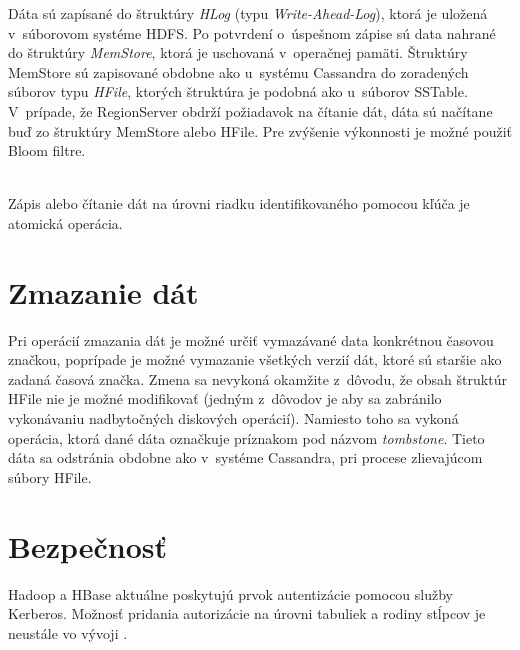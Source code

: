 \documentclass[11pt,twoside,a4paper]{book}
\begin{document}
Dáta sú zapísané do štruktúry \emph{HLog} (typu \emph{Write-Ahead-Log}), ktorá je uložená v~súborovom systéme HDFS. Po potvrdení o~úspešnom zápise sú data nahrané do štruktúry \emph{MemStore}, ktorá je uschovaná v~operačnej pamäti. Štruktúry MemStore sú zapisované obdobne ako u~systému Cassandra do zoradených súborov typu \emph{HFile}, ktorých štruktúra je podobná ako u~súborov SSTable. 
\noindent
V~prípade, že RegionServer obdrží požiadavok na čítanie dát, dáta sú načítane buď zo štruktúry MemStore alebo HFile. Pre zvýšenie výkonnosti je možné použiť Bloom filtre.

% 
% 
\noindent
\\
Zápis alebo čítanie dát na úrovni riadku identifikovaného pomocou kľúča je atomická operácia. 


\section{Zmazanie dát}

Pri operácií zmazania dát je možné určiť vymazávané data konkrétnou časovou značkou, poprípade je možné vymazanie všetkých verzií dát, ktoré sú staršie ako zadaná časová značka. Zmena sa nevykoná okamžite z~dôvodu, že obsah štruktúr HFile nie je možné modifikovať (jedným z~dôvodov je aby sa zabránilo vykonávaniu nadbytočných diskových operácií). Namiesto toho sa vykoná operácia, ktorá dané dáta označkuje príznakom pod názvom \emph{tombstone}. Tieto dáta sa odstránia obdobne ako v~systéme Cassandra, pri procese zlievajúcom súbory HFile.




\section{Bezpečnosť}

Hadoop a HBase aktuálne poskytujú prvok autentizácie pomocou služby Kerberos. Možnosť pridania autorizácie na úrovni tabuliek a rodiny stĺpcov je neustále vo vývoji \cite{hbaseSec}. 
\end{document}
